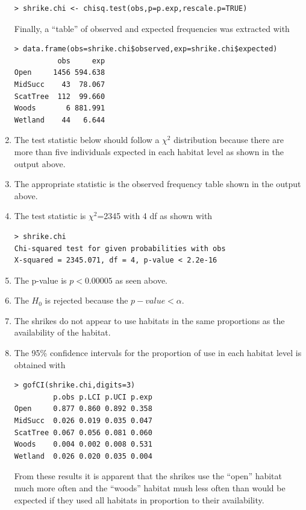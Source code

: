 \documentclass[10pt,openany]{book}\usepackage[]{graphicx}\usepackage[]{color}
\makeatletter
\newenvironment{kframe}{%
 \def\at@end@of@kframe{}%
 \ifinner\ifhmode%
  \def\at@end@of@kframe{\end{minipage}}%
  \begin{minipage}{\columnwidth}%
 \fi\fi%
 \def\FrameCommand##1{\hskip\@totalleftmargin \hskip-\fboxsep
 \colorbox{shadecolor}{##1}\hskip-\fboxsep
     \hskip-\linewidth \hskip-\@totalleftmargin \hskip\columnwidth}%
 \MakeFramed {\advance\hsize-\width
   \@totalleftmargin\z@ \linewidth\hsize
   \@setminipage}}%
 {\par\unskip\endMakeFramed%
 \at@end@of@kframe}
\newenvironment{knitrout}{}{} %
\makeatother
\begin{document}
\begin{enumerate}
\begin{knitrout}
\begin{kframe}
\begin{verbatim}
> shrike.chi <- chisq.test(obs,p=p.exp,rescale.p=TRUE)
\end{verbatim}
\end{kframe}
\end{knitrout}
Finally, a ``table'' of observed and expected frequencies was extracted with
\begin{knitrout}
\color{fgcolor}\begin{kframe}
\begin{verbatim}
> data.frame(obs=shrike.chi$observed,exp=shrike.chi$expected)
          obs     exp
Open     1456 594.638
MidSucc    43  78.067
ScatTree  112  99.660
Woods       6 881.991
Wetland    44   6.644
\end{verbatim}
\end{kframe}
\end{knitrout}
  \item The test statistic below should follow a $\chi^{2}$ distribution because there are more than five individuals expected in each habitat level as shown in the output above.
  \item The appropriate statistic is the observed frequency table shown in the output above.
  \item The test statistic is $\chi^2$=2345 with 4 df as shown with
\begin{knitrout}
\color{fgcolor}\begin{kframe}
\begin{verbatim}
> shrike.chi
Chi-squared test for given probabilities with obs 
X-squared = 2345.071, df = 4, p-value < 2.2e-16
\end{verbatim}
\end{kframe}
\end{knitrout}
  \item The p-value is $p<0.00005$ as seen above.
  \item The $H_{0}$ is rejected because the $p-value<\alpha$.
  \item The shrikes do not appear to use habitats in the same proportions as the availability of the habitat.
  \item The 95\% confidence intervals for the proportion of use in each habitat level is obtained with
\begin{knitrout}
\color{fgcolor}\begin{kframe}
\begin{verbatim}
> gofCI(shrike.chi,digits=3)
         p.obs p.LCI p.UCI p.exp
Open     0.877 0.860 0.892 0.358
MidSucc  0.026 0.019 0.035 0.047
ScatTree 0.067 0.056 0.081 0.060
Woods    0.004 0.002 0.008 0.531
Wetland  0.026 0.020 0.035 0.004
\end{verbatim}
\end{kframe}
\end{knitrout}
From these results it is apparent that the shrikes use the ``open'' habitat much more often and the ``woods'' habitat mush less often than would be expected if they used all habitats in proportion to their availability.
\end{enumerate}
\end{document}
